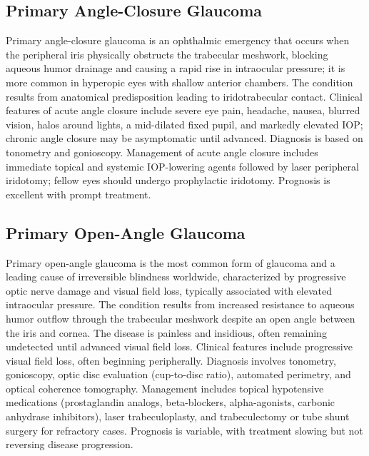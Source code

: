 \subsection{Primary Angle-Closure Glaucoma}
\label{sec:Primary Angle-Closure Glaucoma}
Primary angle-closure glaucoma is an ophthalmic emergency that occurs when the peripheral iris physically obstructs the trabecular meshwork, blocking aqueous humor drainage and causing a rapid rise in intraocular pressure; it is more common in hyperopic eyes with shallow anterior chambers. The condition results from anatomical predisposition leading to iridotrabecular contact. Clinical features of acute angle closure include severe eye pain, headache, nausea, blurred vision, halos around lights, a mid-dilated fixed pupil, and markedly elevated IOP; chronic angle closure may be asymptomatic until advanced. Diagnosis is based on tonometry and gonioscopy. Management of acute angle closure includes immediate topical and systemic IOP-lowering agents followed by laser peripheral iridotomy; fellow eyes should undergo prophylactic iridotomy. Prognosis is excellent with prompt treatment.

\subsection{Primary Open-Angle Glaucoma}
\label{sec:Primary Open-Angle Glaucoma}
Primary open-angle glaucoma is the most common form of glaucoma and a leading cause of irreversible blindness worldwide, characterized by progressive optic nerve damage and visual field loss, typically associated with elevated intraocular pressure. The condition results from increased resistance to aqueous humor outflow through the trabecular meshwork despite an open angle between the iris and cornea. The disease is painless and insidious, often remaining undetected until advanced visual field loss. Clinical features include progressive visual field loss, often beginning peripherally. Diagnosis involves tonometry, gonioscopy, optic disc evaluation (cup-to-disc ratio), automated perimetry, and optical coherence tomography. Management includes topical hypotensive medications (prostaglandin analogs, beta-blockers, alpha-agonists, carbonic anhydrase inhibitors), laser trabeculoplasty, and trabeculectomy or tube shunt surgery for refractory cases. Prognosis is variable, with treatment slowing but not reversing disease progression.

